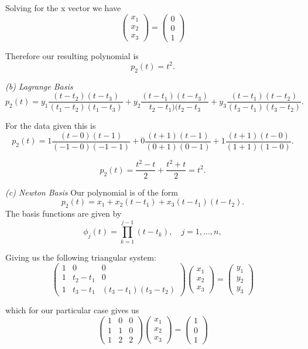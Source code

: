 \documentclass[12pt]{article}
\begin{document}
Solving for the x vector we have 
$$\left(\begin{smallmatrix}
x_1\\x_2\\x_3
\end{smallmatrix}\right)=
\left(\begin{smallmatrix}
0\\0\\1
\end{smallmatrix}\right)$$
 
 Therefore our resulting polynomial is $$p_2(t)=t^2.$$
 
 \textit{(b) Lagrange Basis}
 $$p_2(t) = y_1\frac{(t-t_2)(t-t_3)}{(t_1-t_2)(t_1-t_3)}+y_2\frac{(t-t_1)(t-t_3)}{t_2-t_1)(t_2-t_3}+y_3\frac{(t-t_1)(t-t_2)}{(t_3-t_1)(t_3-t_2)}.$$
 
 For the data given this is
 $$p_2(t) = 1\frac{(t-0)(t-1)}{(-1-0)(-1-1)}+0\frac{(t+1)(t-1)}{(0+1)(0-1)}+1\frac{(t+1)(t-0)}{(1+1)(1-0)}.$$
 
 $$p_2(t) = \frac{t^2-t}{2}+\frac{t^2+t}{2} = t^2.$$
 
 \textit{(c) Newton Basis}
 Our polynomial is of the form
 $$p_2(t)=x_1+x_2(t-t_1)+x_3(t-t_1)(t-t_2).$$
 The basis functions are given by
 $$\phi_j(t) = \prod_{k=1}^{j-1}(t-t_k), \quad j= 1,...,n,$$
 
 Giving us the following triangular system:
 $$\left(\begin{smallmatrix}
1 & 0 & 0\\
1 & t_2-t_1 & 0\\
1 & t_3-t_1 & (t_3-t_1)(t_3-t_2)
\end{smallmatrix}\right)
\left(\begin{smallmatrix}
x_1\\x_2\\x_3
\end{smallmatrix}\right)
=\left(\begin{smallmatrix}
y_1\\y_2\\y_3
\end{smallmatrix}\right)$$

which for our particular case gives us
$$\left(\begin{smallmatrix}
1 & 0 & 0\\
1 & 1 & 0\\
1 & 2 & 2
\end{smallmatrix}\right)
\left(\begin{smallmatrix}
x_1\\x_2\\x_3
\end{smallmatrix}\right)
=\left(\begin{smallmatrix}
1\\0\\1
\end{smallmatrix}\right)$$
\end{document}

